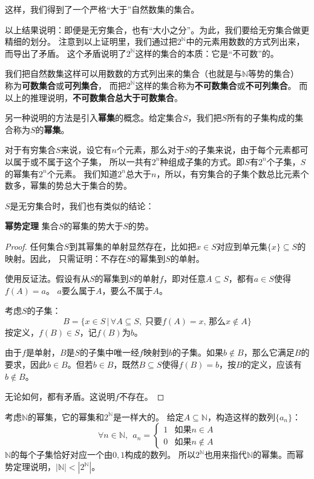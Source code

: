 \documentclass[12pt,UTF8]{ctexbook}
\begin{document}
这样，我们得到了一个严格“大于”自然数集的集合。

以上结果说明：即便是无穷集合，也有“大小之分”。为此，我们要给无穷集合做更精细的划分。
注意到以上证明里，我们通过把$2^\mathbb{N}$中的元素用数数的方式列出来，而导出了矛盾。
这个矛盾说明了$2^\mathbb{N}$这样的集合的本质：它是“不可数”的。

我们把自然数集这样可以用数数的方式列出来的集合（也就是与$\mathbb{N}$等势的集合）
称为\textbf{可数集合}或\textbf{可列集合}，
而把$2^\mathbb{N}$这样的集合称为\textbf{不可数集合}或\textbf{不可列集合}。
而以上的推理说明，\textbf{不可数集合总大于可数集合}。

另一种说明的方法是引入\textbf{幂集}的概念。给定集合$S$，我们把$S$所有的子集构成的集合称为$S$的\textbf{幂集}。

对于有穷集合$S$来说，设它有$n$个元素，那么对于$S$的子集来说，由于每个元素都可以属于或不属于这个子集，
所以一共有$2^n$种组成子集的方式。即$S$有$2^n$个子集，$S$的幂集有$2^n$个元素。
我们知道$2^n$总大于$n$，所以，有穷集合的子集个数总比元素个数多，幂集的势总大于集合的势。

$S$是无穷集合时，我们也有类似的结论：
\begin{tm}{\textbf{幂势定理}}
    集合$S$的幂集的势大于$S$的势。
\end{tm}

\begin{proof}
    任何集合$S$到其幂集的单射显然存在，比如把$x\in S$对应到单元集$\{x\}\subseteq S$的映射。因此，
    只需证明：不存在$S$的幂集到$S$的单射。
    
    使用反证法。假设有从$S$的幂集到$S$的单射$f$，即对任意$A\subseteq S$，都有$a\in S$使得$f(A) = a$。
    $a$要么属于$A$，要么不属于$A$。

    考虑$S$的子集：
    $$ B = \{x\in S \, | \, \forall A\subseteq S,\;\mbox{只要} f(A) = x,\,\mbox{那么} x\notin A\}$$
    按定义，$f(B)\in S$，记$f(B)$为$b$。
    
    由于$f$是单射，$B$是$S$的子集中唯一经$f$映射到$b$的子集。如果$b\notin B$，那么它满足$B$的要求，因此$b\in B$。但若$b\in B$，既然$B\subseteq S$使得$f(B)=b$，按$B$的定义，应该有$b \notin B$。

    无论如何，都有矛盾。这说明$f$不存在。
\end{proof}

考虑$\mathbb{N}$的幂集，它的幂集和$2^\mathbb{N}$是一样大的。
给定$A\subseteq \mathbb{N}$，构造这样的数列$\{a_n\}$：
$$\forall n \in \mathbb{N},\;\,
a_n = \begin{cases}
    1 & \mbox{如果} n \in A \\
    0 & \mbox{如果} n \notin A
\end{cases}
$$
$\mathbb{N}$的每个子集恰好对应一个由$0,1$构成的数列。
所以$2^\mathbb{N}$也用来指代$\mathbb{N}$的幂集。而幂势定理说明，$|\mathbb{N}| < |2^\mathbb{N}|$。
\end{document}
